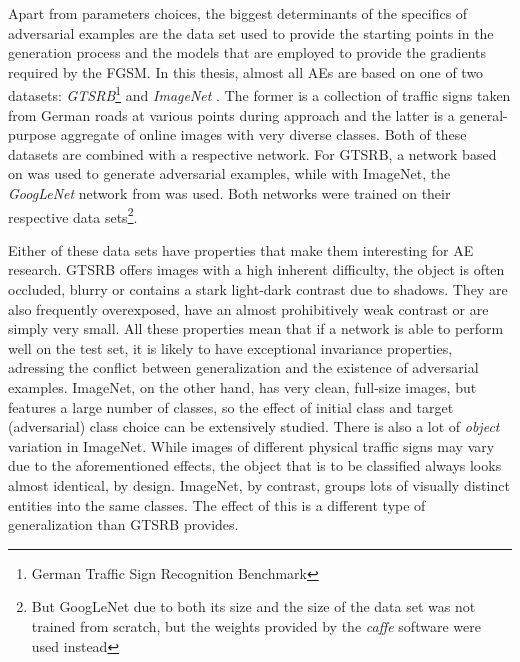 \documentclass[11pt, a4paper]{article}
\begin{document}
Apart from parameters choices, the biggest determinants of the specifics of adversarial examples are the data set used to provide the starting points in the generation process and the models that are employed to provide the gradients required by the FGSM. In this thesis, almost all AEs are based on one of two datasets: \emph{GTSRB}\footnote{German Traffic Sign Recognition Benchmark} \cite{gtsrb-description} and \emph{ImageNet} \cite{imagenet-large-scale-hierarchical-image-database}. The former is a collection of traffic signs taken from German roads at various points during approach and the latter is a general-purpose aggregate of online images with very diverse classes. Both of these datasets are combined with a respective network. For GTSRB, a network based on \cite{multi-column-neural-network-gtsrb} was used to generate adversarial examples, while with ImageNet, the \emph{GoogLeNet} network from \cite{going-deeper-with-convolutions} was used. Both networks were trained on their respective data sets\footnote{But GoogLeNet due to both its size and the size of the data set was not trained from scratch, but the weights provided by the \emph{caffe} software were used instead}.

Either of these data sets have properties that make them interesting for AE research. GTSRB offers images with a high inherent difficulty, the object is often occluded, blurry or contains a stark light-dark contrast due to shadows. They are also frequently overexposed, have an almost prohibitively weak contrast or are simply very small. All these properties mean that if a network is able to perform well on the test set, it is likely to have exceptional invariance properties, adressing the conflict between generalization and the existence of adversarial examples. ImageNet, on the other hand, has very clean, full-size images, but features a large number of classes, so the effect of initial class and target (adversarial) class choice can be extensively studied. There is also a lot of \emph{object} variation in ImageNet. While images of different physical traffic signs may vary due to the aforementioned effects, the object that is to be classified always looks almost identical, by design. ImageNet, by contrast, groups lots of visually distinct entities into the same classes. The effect of this is a different type of generalization than GTSRB provides.
\end{document}
